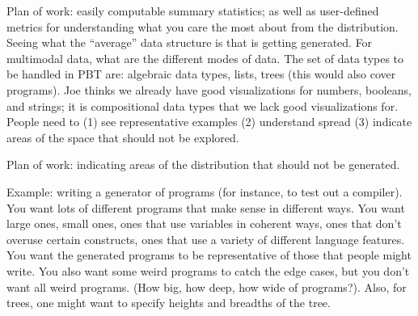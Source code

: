 


Plan of work: easily computable summary statistics; as well as user-defined metrics for understanding what you care the most about from the distribution. Seeing what the “average” data structure is that is getting generated. For multimodal data, what are the different modes of data. The set of data types to be handled in PBT are: algebraic data types, lists, trees (this would also cover programs). Joe thinks we already have good visualizations for numbers, booleans, and strings; it is compositional data types that we lack good visualizations for. People need to (1) see representative examples (2) understand spread (3) indicate areas of the space that should not be explored.   


Plan of work: indicating areas of the distribution that should not be generated.

Example: writing a generator of programs (for instance, to test out a compiler). You want lots of different programs that make sense in different ways. You want large ones, small ones, ones that use variables in coherent ways, ones that don’t overuse certain constructs, ones that use a variety of different language features. You want the generated programs to be representative of those that people might write. You also want some weird programs to catch the edge cases, but you don’t want all weird programs. (How big, how deep, how wide of programs?). Also, for trees, one might want to specify heights and breadths of the tree.

